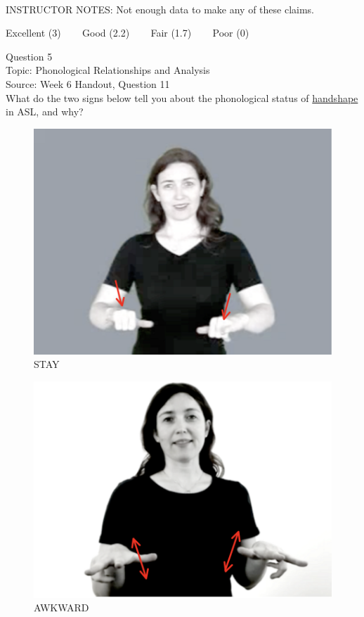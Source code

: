 \documentclass[12pt]{article}
\begin{document}
~\\
INSTRUCTOR NOTES: Not enough data to make any of these claims.


\vfill
Excellent (3) ~~~ Good (2.2) ~~~ Fair (1.7) ~~~ Poor (0)
\newpage

{\large Question 5}\\

Topic: Phonological Relationships and Analysis\\
Source: Week 6 Handout, Question 11\\

What do the two signs below tell you about the phonological status of \underline{handshape} in ASL, and why?\\

\begin{figure}[H]
\includegraphics{../images/asl_stay.png}
\caption{STAY}
\end{figure}
\begin{figure}[H]
\includegraphics{../images/asl_awkward.png}
\caption{AWKWARD}
\end{figure}
\end{document}
